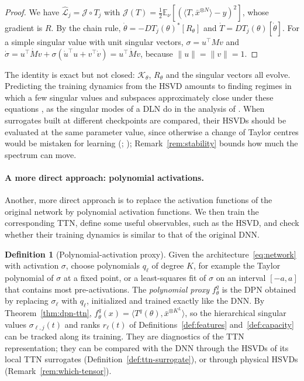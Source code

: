\documentclass[11pt]{article}
\newcommand{\E}{\mathbb{E}}
\newcommand{\ip}[2]{\langle #1,#2\rangle}
\newcommand{\norm}[1]{\lVert #1\rVert}
\newcommand{\xb}{\bar{x}}
\newcommand{\Lhat}{\widehat{\mathcal L}}
\theoremstyle{definition}
\newtheorem{definition}[theorem]{Definition}
\numberwithin{equation}{section}
\begin{document}
\begin{proof}
We have $\Lhat_j=\mathcal J\circ T_j$ with $\mathcal J(T)=\frac12\E_\nu[(\ip{T}{\xb^{\otimes N}}-y)^2]$, whose gradient is $R$. By the chain rule, $\dot\theta=-DT_j(\theta)^*[R_\theta]$ and $\dot T=DT_j(\theta)[\dot\theta]$. For a simple singular value with unit singular vectors, $\sigma=u^\top Mv$ and $\dot\sigma=u^\top\dot Mv+\sigma(\dot u^\top u+v^\top\dot v)=u^\top\dot Mv$, because $\norm u=\norm v=1$.
\end{proof}

The identity is exact but not closed: $\mathcal K_\theta$, $R_\theta$ and the singular vectors all evolve. Predicting the training dynamics from the HSVD amounts to finding regimes in which a few singular values and subspaces approximately close under these equations \citep[Section~12]{hfl_surrogate}, as the singular modes of a DLN do in the analysis of \citet{saxe2014exact}. When surrogates built at different checkpoints are compared, their HSVDs should be evaluated at the same parameter value, since otherwise a change of Taylor centres would be mistaken for learning (\citealp[Section~8.5]{hfl_local}; \citealp[Section~9.1]{hfl_surrogate}); Remark~\ref{rem:stability} bounds how much the spectrum can move.

\paragraph{A more direct approach: polynomial activations.}
Another, more direct approach is to replace the activation functions of the original network by polynomial activation functions. We then train the corresponding TTN, define some useful observables, such as the HSVD, and check whether their training dynamics is similar to that of the original DNN.

\begin{definition}[Polynomial-activation proxy]\label{def:poly-proxy}
Given the architecture~\eqref{eq:network} with activation $\sigma$, choose polynomials $q_\ell$ of degree $K$, for example the Taylor polynomial of $\sigma$ at a fixed point, or a least-squares fit of $\sigma$ on an interval $[-a,a]$ that contains most pre-activations. The \emph{polynomial proxy} $f^q_\theta$ is the DPN obtained by replacing $\sigma_\ell$ with $q_\ell$, initialized and trained exactly like the DNN. By Theorem~\ref{thm:dpn-ttn}, $f^q_\theta(x)=\ip{T^q(\theta)}{\xb^{\otimes K^L}}$, so the hierarchical singular values $\sigma_{\ell,j}(t)$ and ranks $r_\ell(t)$ of Definitions~\ref{def:features} and~\ref{def:capacity} can be tracked along its training. They are diagnostics of the TTN representation; they can be compared with the DNN through the HSVDs of its local TTN surrogates (Definition~\ref{def:ttn-surrogate}), or through physical HSVDs (Remark~\ref{rem:which-tensor}).
\end{definition}
\end{document}
